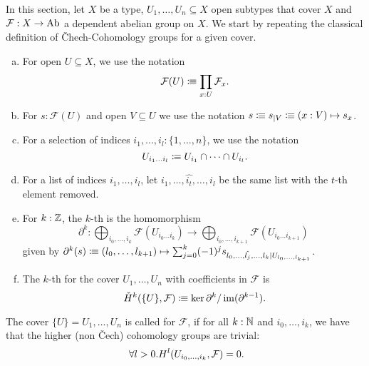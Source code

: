 
In this section, let $X$ be a type, $U_1,\dots,U_n\subseteq X$ open subtypes that cover $X$
and $\mathcal F:X\to \operatorname{Ab}$ a dependent abelian group on $X$.
We start by repeating the classical definition of \v{C}hech-Cohomology groups for a given cover.

\begin{definition}%
  \label{chech-complex}
  \begin{enumerate}[(a)]
  \item {} For open $U\subseteq X$, we use the notation
    \[
      \mathcal F(U)\colonequiv \prod_{x:U}\mathcal F_x\rlap{.}
    \]
  \item For $s:\mathcal F(U)$ and open $V\subseteq U$ we use the notation $s\vcentcolon\mspace{-1.2mu}\equiv s_{|V} \vcentcolon\mspace{-1.2mu}\equiv (x:V)\mapsto s_x$.
  \item {}For a selection of indices $i_1,...,i_l:\{1,\dots,n\}$, we use the notation
    \[
      U_{i_1\dots i_l}\colonequiv U_{i_1}\cap\dots\cap U_{i_l}\rlap{.}
    \]
  \item For a list of indices $i_1,\dots,i_l$, let $i_1,\dots,\hat{i_t},\dots,i_l$ be the same list with the $t$-th element removed.
  \item For $k:\mathbb{Z}$, the $k$-th  is the homomorphism
    \[
      \partial^k:\bigoplus_{i_0,\dots,i_k}\mathcal F(U_{i_0\dots i_k})\to \bigoplus_{i_0,\dots,i_{k+1}}\mathcal F(U_{i_0\dots i_{k+1}})
    \]
    given by $\partial^k(s)\vcentcolon\mspace{-1.2mu}\equiv (l_0,\dots,l_{k+1}) \mapsto \sum_{j=0}^k (-1)^j s_{l_0,\dots,\hat{l_j},\dots,l_k|U_{l_0,\dots,l_{k+1}}}$.
  \item The $k$-th  for the cover $U_1,\dots,U_n$ with coefficients in $\mathcal F$ is
    \[
      \check{H}^k(\{U\},\mathcal F)\colonequiv \ker\partial^{k} / \im(\partial^{k-1})\rlap{.}
    \]
  \end{enumerate}
\end{definition}

\begin{definition}
  The cover $\{U\}=U_1,\dots,U_n$ is called  for $\mathcal F$,
  if for all $k:\mathbb{N}$ and $i_0,\dots,i_k$, we have that the higher (non Čech) cohomology groups are trivial:
  \[
    \forall l>0. H^l(U_{i_0,\dots,i_k},\mathcal F)=0\rlap{.}
  \]
\end{definition}

